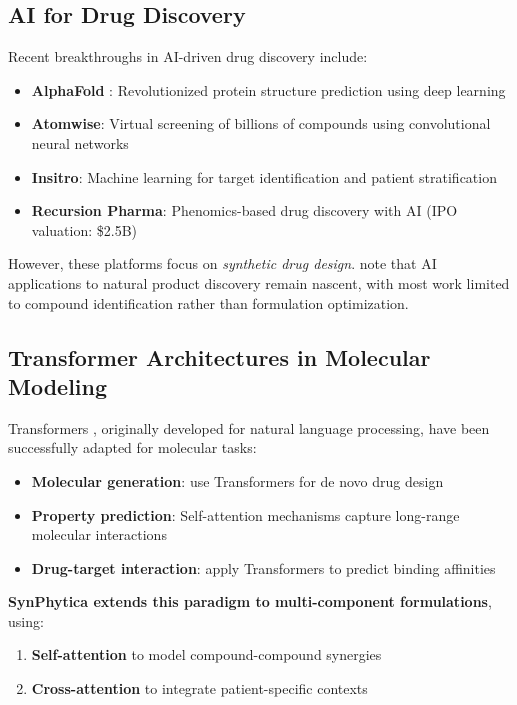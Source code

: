 \documentclass[12pt, a4paper]{article}
\begin{document}
\subsection{AI for Drug Discovery}

Recent breakthroughs in AI-driven drug discovery include:

\begin{itemize}
    \item \textbf{AlphaFold} \citep{Jumper2021}: Revolutionized protein structure prediction using deep learning
    \item \textbf{Atomwise}: Virtual screening of billions of compounds using convolutional neural networks
    \item \textbf{Insitro}: Machine learning for target identification and patient stratification
    \item \textbf{Recursion Pharma}: Phenomics-based drug discovery with AI (IPO valuation: \$2.5B)
\end{itemize}

However, these platforms focus on \textit{synthetic drug design}. \citet{NaturalProduct2024} note that AI applications to natural product discovery remain nascent, with most work limited to compound identification rather than formulation optimization.

\subsection{Transformer Architectures in Molecular Modeling}

Transformers \citep{Vaswani2017}, originally developed for natural language processing, have been successfully adapted for molecular tasks:

\begin{itemize}
    \item \textbf{Molecular generation}: \citet{TransformerMol2023} use Transformers for de novo drug design
    \item \textbf{Property prediction}: Self-attention mechanisms capture long-range molecular interactions
    \item \textbf{Drug-target interaction}: \citet{DrugTarget2024} apply Transformers to predict binding affinities
\end{itemize}

\textbf{SynPhytica extends this paradigm to multi-component formulations}, using:
\begin{enumerate}
    \item \textbf{Self-attention} to model compound-compound synergies
    \item \textbf{Cross-attention} to integrate patient-specific contexts
\end{enumerate}
\end{document}
